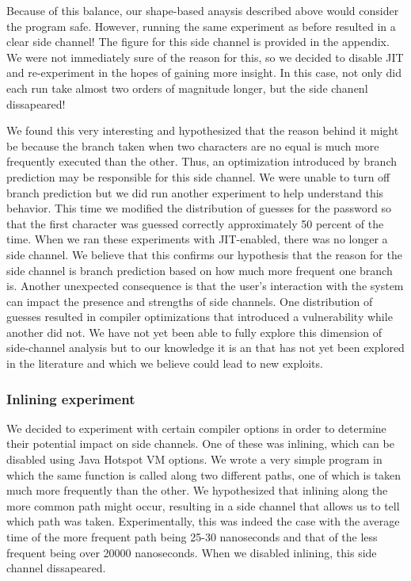 Because of this balance, our shape-based anaysis described above would consider the program safe. However, running the same experiment as before resulted in a clear side channel! The figure for this side channel is provided in the appendix. We were not immediately sure of the reason for this, so we decided to disable JIT and re-experiment in the hopes of gaining more insight. In this case, not only did each run take almost two orders of magnitude longer, but the side chanenl dissapeared!

We found this very interesting and hypothesized that the reason behind it might be because the branch taken when two characters are no equal is much more frequently executed than the other. Thus, an optimization introduced by branch prediction may be responsible for this side channel. We were unable to turn off branch prediction but we did run another experiment to help understand this behavior. This time we modified the distribution of guesses for the password so that the first character was guessed correctly approximately 50 percent of the time. When we ran these experiments with JIT-enabled, there was no longer a side channel. We believe that this confirms our hypothesis that the reason for the side channel is branch prediction based on how much more frequent one branch is. Another unexpected consequence is that the user's interaction with the system can impact the presence and strengths of side channels. One distribution of guesses resulted in compiler optimizations that introduced a vulnerability while another did not. We have not yet been able to fully explore this dimension of side-channel analysis but to our knowledge it is an that has not yet been explored in the literature and which we believe could lead to new exploits. 

\subsubsection{Inlining experiment} We decided to experiment with certain compiler options in order to determine their potential impact on side channels. One of these was inlining, which can be disabled using Java Hotspot VM options. We wrote a very simple program in which the same function is called along two different paths, one of which is taken much more frequently than the other. We hypothesized that inlining along the more common path might occur, resulting in a side channel that allows us to tell which path was taken. Experimentally, this was indeed the case with the average time of the more frequent path being 25-30 nanoseconds and that of the less frequent being over 20000 nanoseconds. When we disabled inlining, this side channel dissapeared. 